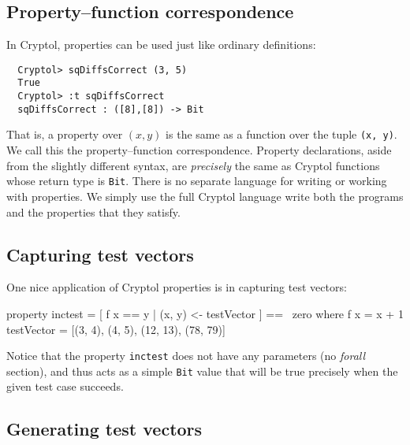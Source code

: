 \subsection{Property--function correspondence}\indThmFuncCorr
\label{sec:prop-funct-corr}

In Cryptol, properties can be used just like ordinary definitions:
\begin{Verbatim}
  Cryptol> sqDiffsCorrect (3, 5)
  True
  Cryptol> :t sqDiffsCorrect
  sqDiffsCorrect : ([8],[8]) -> Bit
\end{Verbatim}
That is, a property over {\tt$(x, y)$} is the same as a function over
the tuple {\tt (x, y)}. We call this the property--function
correspondence. Property declarations, aside from the slightly
different syntax, are \emph{precisely} the same as Cryptol functions
whose return type is \texttt{Bit}. There is no separate language for
writing or working with properties. We simply use the full Cryptol
language write both the programs and the properties that they satisfy.

\subsection{Capturing test vectors}
\label{sec:thmvec}

One nice application of Cryptol properties is in capturing test
vectors:\indZero
\begin{code}
  property inctest = [ f x == y | (x, y) <- testVector ] == ~zero
    where  f x = x + 1
           testVector = [(3, 4), (4, 5), (12, 13), (78, 79)]
\end{code}
Notice that the property \texttt{inctest} does not have any parameters
(no \emph{forall} section), and thus acts as a simple \texttt{Bit} value
that will be true precisely when the given test case succeeds.


\subsection{Generating test vectors}
\label{sec:gentestvec}

